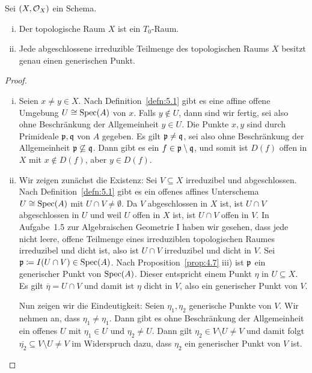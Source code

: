 \begin{prop}
\label{prop:5.4}
	Sei $(X, \mathcal{O}_X)$ ein Schema.
	\begin{enumerate}[i)]
		\item Der topologische Raum $X$ ist ein $T_0$-Raum.
		\item Jede abgeschlossene irreduzible Teilmenge des topologischen Raums $X$ besitzt genau einen generischen Punkt.
	\end{enumerate}
	\begin{proof}
		\begin{enumerate}[i)]
			\item Seien $x\neq y \in X$. Nach Definition~\ref{defn:5.1} gibt es eine affine offene Umgebung $U \cong \operatorname{Spec}(A)$ von $x$. Falls $y \notin U$, dann sind wir fertig, sei also ohne Beschränkung der Allgemeinheit $y \in U$. Die Punkte $x,y$ sind durch Primideale $\mathfrak{p},\mathfrak{q}$ von $A$ gegeben. Es gilt $\mathfrak{p} \neq \mathfrak{q}$, sei also ohne Beschränkung der Allgemeinheit $\mathfrak{p} \not\subseteq \mathfrak{q}$. Dann gibt es ein $f \in \mathfrak{p} \setminus \mathfrak{q}$, und somit ist $D(f)$ offen in $X$ mit $x \notin D(f)$, aber $y\in D(f)$.
			\item Wir zeigen zunächst die Existenz: Sei $V\subseteq X$ irreduzibel und abgeschlossen. Nach Definition~\ref{defn:5.1} gibt es ein offenes affines Unterschema $U \cong \operatorname{Spec}(A)$ mit $U \cap V \neq \emptyset$. Da $V$ abgeschlossen in $X$ ist, ist $U \cap V$ abgeschlossen in $U$ und weil $U$ offen in $X$ ist, ist $U \cap V$ offen in $V$. In Aufgabe~1.5 zur Algebraischen Geometrie I haben wir gesehen, dass jede nicht leere, offene Teilmenge eines irreduziblen topologischen Raumes irreduzibel und dicht ist, also ist $U \cap V$ irreduzibel und dicht in $V$. Sei $\mathfrak{p} \coloneqq I(U \cap V) \in \operatorname{Spec}(A)$. Nach Proposition~\ref{prop:4.7} iii) ist $\mathfrak{p}$ ein generischer Punkt von $\operatorname{Spec}(A)$. Dieser entspricht einem Punkt $\eta$ in $U \subseteq X$. Es gilt $\overline{\eta}=U\cap V$ und damit ist $\eta$ dicht in $V$, also ein generischer Punkt von $V$.

			Nun zeigen wir die Eindeutigkeit: Seien $\eta_1,\eta_2$ generische Punkte von $V$. Wir nehmen an, dass $\eta_1 \neq \eta_1$. Dann gibt es ohne Beschränkung der Allgemeinheit ein offenes $U$ mit $\eta_1 \in U$ und $\eta_2 \neq U$. Dann gilt $\eta_2 \in V\setminus U \neq V$ und damit folgt $\overline{\eta_2} \subseteq V\setminus U \neq V$ im Widerspruch dazu, dass $\eta_2$ ein generischer Punkt von $V$ ist.
		\end{enumerate}
	\end{proof}
\end{prop}

